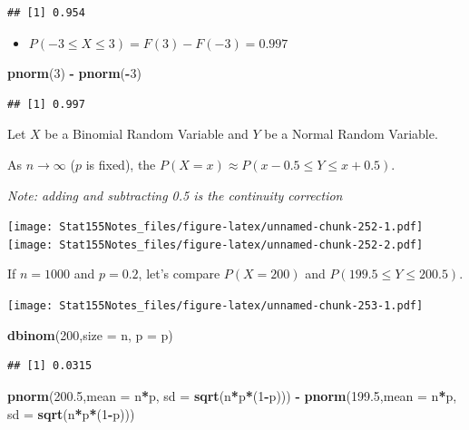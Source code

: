 \documentclass[]{book}
\newenvironment{Shaded}{\begin{snugshade}}{\end{snugshade}}
\newcommand{\DataTypeTok}[1]{\textcolor[rgb]{0.13,0.29,0.53}{#1}}
\newcommand{\DecValTok}[1]{\textcolor[rgb]{0.00,0.00,0.81}{#1}}
\newcommand{\FloatTok}[1]{\textcolor[rgb]{0.00,0.00,0.81}{#1}}
\newcommand{\KeywordTok}[1]{\textcolor[rgb]{0.13,0.29,0.53}{\textbf{#1}}}
\newcommand{\NormalTok}[1]{#1}
\newcommand{\OperatorTok}[1]{\textcolor[rgb]{0.81,0.36,0.00}{\textbf{#1}}}
\newcommand{\StringTok}[1]{\textcolor[rgb]{0.31,0.60,0.02}{#1}}
\providecommand{\tightlist}{%
  \setlength{\itemsep}{0pt}\setlength{\parskip}{0pt}}
\begin{document}
\begin{verbatim}
## [1] 0.954
\end{verbatim}

\begin{itemize}
\tightlist
\item
  \(P(-3\leq X \leq 3) = F(3) - F(-3) = 0.997\)
\end{itemize}

\begin{Shaded}
\begin{Highlighting}[]
\KeywordTok{pnorm}\NormalTok{(}\DecValTok{3}\NormalTok{) }\OperatorTok{-}\StringTok{ }\KeywordTok{pnorm}\NormalTok{(}\OperatorTok{-}\DecValTok{3}\NormalTok{)}
\end{Highlighting}
\end{Shaded}

\begin{verbatim}
## [1] 0.997
\end{verbatim}

Let \(X\) be a Binomial Random Variable and \(Y\) be a Normal Random Variable.

As \(n\rightarrow \infty\) (\(p\) is fixed), the \(P(X = x) \approx P(x-0.5 \leq Y \leq x+0.5)\).

\emph{Note: adding and subtracting 0.5 is the continuity correction}

\texttt{[image: Stat155Notes\_files/figure-latex/unnamed-chunk-252-1.pdf]} \texttt{[image: Stat155Notes\_files/figure-latex/unnamed-chunk-252-2.pdf]}

If \(n=1000\) and \(p=0.2\), let's compare \(P(X=200)\) and \(P(199.5\leq Y\leq 200.5)\).

\texttt{[image: Stat155Notes\_files/figure-latex/unnamed-chunk-253-1.pdf]}

\begin{Shaded}
\begin{Highlighting}[]
\KeywordTok{dbinom}\NormalTok{(}\DecValTok{200}\NormalTok{,}\DataTypeTok{size =}\NormalTok{ n, }\DataTypeTok{p =}\NormalTok{ p)}
\end{Highlighting}
\end{Shaded}

\begin{verbatim}
## [1] 0.0315
\end{verbatim}

\begin{Shaded}
\begin{Highlighting}[]
\KeywordTok{pnorm}\NormalTok{(}\FloatTok{200.5}\NormalTok{,}\DataTypeTok{mean =}\NormalTok{ n}\OperatorTok{*}\NormalTok{p, }\DataTypeTok{sd =} \KeywordTok{sqrt}\NormalTok{(n}\OperatorTok{*}\NormalTok{p}\OperatorTok{*}\NormalTok{(}\DecValTok{1}\OperatorTok{-}\NormalTok{p))) }\OperatorTok{-}\StringTok{ }\KeywordTok{pnorm}\NormalTok{(}\FloatTok{199.5}\NormalTok{,}\DataTypeTok{mean =}\NormalTok{ n}\OperatorTok{*}\NormalTok{p, }\DataTypeTok{sd =} \KeywordTok{sqrt}\NormalTok{(n}\OperatorTok{*}\NormalTok{p}\OperatorTok{*}\NormalTok{(}\DecValTok{1}\OperatorTok{-}\NormalTok{p)))}
\end{Highlighting}
\end{Shaded}
\end{document}
